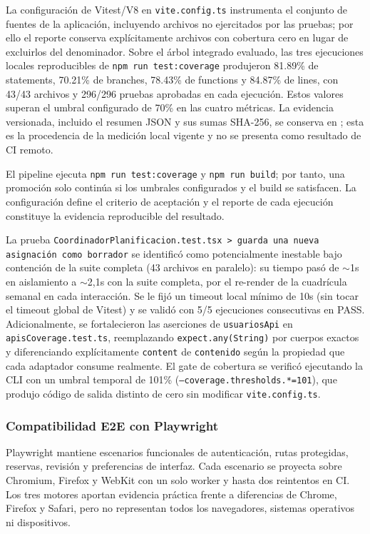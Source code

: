La configuración de Vitest/V8 en \texttt{vite.config.ts} instrumenta el conjunto
de fuentes de la aplicación, incluyendo archivos no ejercitados por las pruebas;
por ello el reporte conserva explícitamente archivos con cobertura cero en lugar
de excluirlos del denominador. Sobre el árbol integrado evaluado, las tres ejecuciones locales reproducibles
de \texttt{npm run test:coverage} produjeron 81.89\% de statements, 70.21\%
de branches, 78.43\% de functions y 84.87\% de lines, con 43/43 archivos y
296/296 pruebas aprobadas en cada ejecución. Estos valores superan el umbral
configurado de 70\% en las cuatro métricas. La evidencia versionada, incluido
el resumen JSON y sus sumas SHA-256, se conserva en
; esta es la procedencia
de la medición local vigente y no se presenta como resultado de CI remoto.

El pipeline ejecuta \texttt{npm run test:coverage} y \texttt{npm run build}; por
tanto, una promoción solo continúa si los umbrales configurados y el build se
satisfacen. La configuración define el criterio de aceptación y el reporte de
cada ejecución constituye la evidencia reproducible del resultado.

La prueba \texttt{CoordinadorPlanificacion.test.tsx > guarda una nueva
asignación como borrador} se identificó como potencialmente inestable bajo
contención de la suite completa (43 archivos en paralelo): su tiempo pasó de
$\sim$1s en aislamiento a $\sim$2,1s con la suite completa, por el re-render de
la cuadrícula semanal en cada interacción. Se le fijó un timeout local mínimo
de 10s (sin tocar el timeout global de Vitest) y se validó con 5/5 ejecuciones
consecutivas en PASS. Adicionalmente, se fortalecieron las aserciones de
\texttt{usuariosApi} en \texttt{apisCoverage.test.ts}, reemplazando
\texttt{expect.any(String)} por cuerpos exactos y diferenciando explícitamente
\texttt{content} de \texttt{contenido} según la propiedad que cada adaptador
consume realmente. El gate de cobertura se verificó ejecutando la CLI con un
umbral temporal de 101\% (\texttt{--coverage.thresholds.*=101}), que produjo
código de salida distinto de cero sin modificar \texttt{vite.config.ts}.

\subsubsection{Compatibilidad E2E con Playwright}

Playwright mantiene escenarios funcionales de autenticación, rutas protegidas,
reservas, revisión y preferencias de interfaz. Cada escenario se proyecta sobre
Chromium, Firefox y WebKit con un
solo worker y hasta dos reintentos en CI. Los tres motores aportan evidencia
práctica frente a diferencias de Chrome, Firefox y Safari, pero no representan
todos los navegadores, sistemas operativos ni dispositivos.

